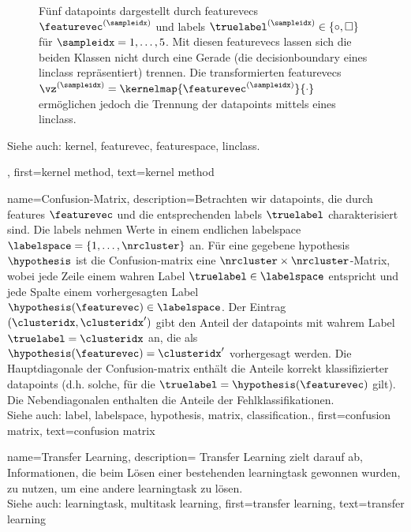 {{{{{{\begin{figure}[H]
\begin{center}
\end{center}
\caption{
Fünf \glspl{datapoint} dargestellt durch \glspl{featurevec} $\featurevec^{(\sampleidx)}$ 
und \glspl{label} $\truelabel^{(\sampleidx)} \in \{ \circ, \square \}$ für $\sampleidx=1, \ldots, 5$. 
Mit diesen \glspl{featurevec} lassen sich die beiden Klassen nicht durch eine Gerade (die \gls{decisionboundary} eines \gls{linclass} repräsentiert) trennen. 
Die transformierten \glspl{featurevec} $\vz^{(\sampleidx)} = \kernelmap{\featurevec^{(\sampleidx)}}{\cdot}$ 
ermöglichen jedoch die Trennung der \glspl{datapoint} mittels eines \gls{linclass}.  \label{fig_linsep_kernel_dict}}
\end{figure}
		Siehe auch: \gls{kernel}, \gls{featurevec}, \gls{featurespace}, \gls{linclass}.},
	first={kernel method},
	text={kernel method} 
}

{name={Confusion-Matrix}, 
	description={Betrachten wir \glspl{datapoint}, die durch \glspl{feature} $\featurevec$ und die entsprechenden \glspl{label} $\truelabel$ charakterisiert sind. 
		Die \glspl{label} nehmen Werte in einem endlichen \gls{labelspace} $\labelspace = \{1, \ldots, \nrcluster\}$ an. 
		Für eine gegebene \gls{hypothesis} $\hypothesis$ ist die Confusion-\gls{matrix} eine 
		$\nrcluster \times \nrcluster$-Matrix, wobei jede Zeile einem wahren Label $\truelabel \in \labelspace$ entspricht und jede Spalte einem vorhergesagten Label $\hypothesis(\featurevec) \in \labelspace$. 
		Der Eintrag $(\clusteridx,\clusteridx')$ gibt den Anteil der \glspl{datapoint} mit wahrem Label $\truelabel = \clusteridx$ an, die als $\hypothesis(\featurevec) = \clusteridx'$ vorhergesagt werden. 
		Die Hauptdiagonale der Confusion-\gls{matrix} enthält die Anteile korrekt klassifizierter \glspl{datapoint} (d.h. solche, für die $\truelabel = \hypothesis(\featurevec)$ gilt). Die Nebendiagonalen enthalten die Anteile der Fehlklassifikationen. 
				\\
		Siehe auch: \gls{label}, \gls{labelspace}, \gls{hypothesis}, \gls{matrix}, \gls{classification}.},
	first={confusion matrix},
	text={confusion matrix} 
}

{name={Transfer Learning},
  description=
  {Transfer Learning zielt darauf ab, Informationen, die beim Lösen einer bestehenden \gls{learningtask} gewonnen wurden, zu nutzen, um eine andere \gls{learningtask} zu lösen.\\ 
   Siehe auch: \gls{learningtask}, \gls{multitask learning}},
  first={transfer learning},
  text={transfer learning}
}

}}}}
